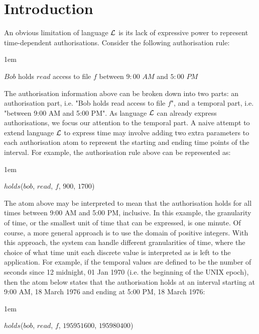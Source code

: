 \documentclass[11pt]{report}
\newenvironment{vquote}
{
  \begin{list}{}{\leftmargin 1em}\item[]
}
{
  \end{list}
}
\begin{document}
    \section{Introduction}
      \label{sect-intro}

      An obvious limitation of language ${\cal L}$ is its lack of expressive
      power to represent time-dependent authorisations. Consider the following
      authorisation rule:

      \begin{vquote}
        $Bob$ holds $read$ access to file $f$ between $9:00$ $AM$ and $5:00$
        $PM$
      \end{vquote}

      The authorisation information above can be broken down into two parts: an
      authorisation part, i.e. "Bob holds read access to file $f$", and a
      temporal part, i.e. "between 9:00 AM and 5:00 PM". As language ${\cal L}$
      can already express authorisations, we focus our attention to the
      temporal part. A naive attempt to extend language ${\cal L}$ to express
      time may involve adding two extra parameters to each authorisation atom
      to represent the starting and ending time points of the interval. For
      example, the authorisation rule above can be represented as:

      \begin{vquote}
        $holds$($bob$, $read$, $f$, $900$, $1700$)
      \end{vquote}

      The atom above may be interpreted to mean that the authorisation holds
      for all times between 9:00 AM and 5:00 PM, inclusive. In this example,
      the granularity of time, or the smallest unit of time that can be
      expressed, is one minute. Of course, a more general approach is to use
      the domain of positive integers. With this approach, the system can
      handle different granularities of time, where the choice of what time
      unit each discrete value is interpreted as is left to the application.
      For example, if the temporal values are defined to be the number of
      seconds since 12 midnight, 01 Jan 1970 (i.e. the beginning of the UNIX
      epoch), then the atom below states that the authorisation holds at an
      interval starting at 9:00 AM, 18 March 1976 and ending at 5:00 PM, 18
      March 1976:

      \begin{vquote}
        $holds$($bob$, $read$, $f$, $195951600$, $195980400$)
      \end{vquote}
\end{document}
